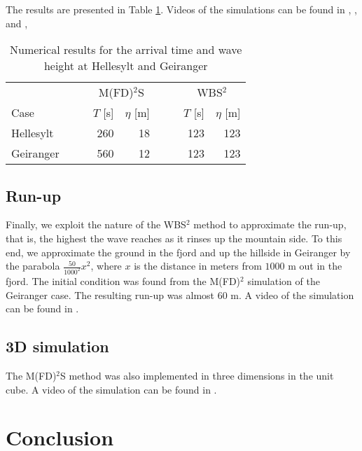\documentclass[11pt]{article}
\begin{document}
The results are presented in Table \ref{tab:TimeHeight}. Videos of the simulations can be found in \cite{hellesyltMFDFD}, \cite{hellesyltWBSS}, \cite{geriangerWBSS} and \cite{geirangerMFDFD},
\begin{table}[H]
	\begin{center}
	    \begin{tabular}{l r r r r r r}
	                     &    $\quad$    &    \multicolumn{2}{c}{M(FD)$^2$S}    &    $\quad$    &    \multicolumn{2}{c}{WBS$^2$}      \\
	        Case         &               &    $T$ [s]    &    $\eta$ [m]        &               &    $T$ [s]    &    $\eta$ [m]    \\
            \hline                                                                               
            Hellesylt    &               &    260        &    18                &               &    123        &    123               \\
            Geiranger    &               &    560        &    12                &               &    123        &        123               \\
	    \end{tabular}
	\end{center}
	\caption{Numerical results for the arrival time and wave height at Hellesylt and Geiranger}
	\label{tab:TimeHeight}
\end{table}
\subsection{Run-up}
Finally, we exploit the nature of the WBS$^2$ method to approximate the run-up, that is, the highest the wave reaches as it rinses up the mountain side. To this end, we
approximate the ground in the fjord and up the hillside in Geiranger by the parabola $\frac{50}{1000^2}x^2$, where $x$ is the distance in meters from $1000$ m out in the fjord. The initial condition was found from the
M(FD)$^2$ simulation of the Geiranger case.
The resulting run-up was almost 60 m. A video of the simulation can be found in \cite{geirangerUnUpWBS}.    
\subsection{3D simulation}
The M(FD)$^2$S method was also implemented in three dimensions in the unit cube. A video of the simulation
can be found in \cite{MFDFD3dExample}.
%
%
\section{Conclusion}
\end{document}
